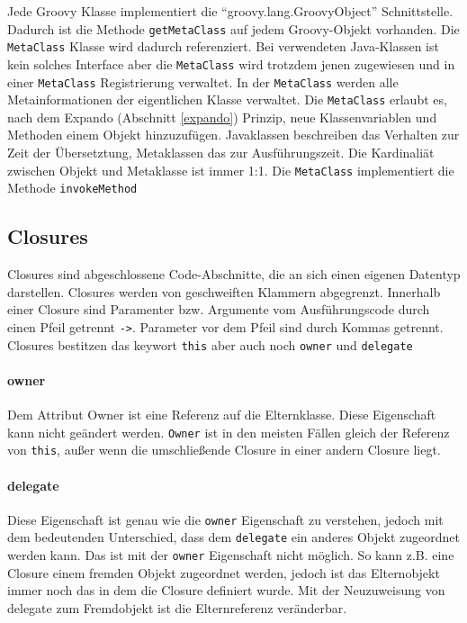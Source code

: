 \documentclass[11pt,english,ngerman, headsepline]{scrreprt}
\begin{document}
Jede Groovy Klasse implementiert die ``groovy.lang.GroovyObject''
 Schnittstelle.
Dadurch ist die Methode \texttt{getMetaClass} auf jedem Groovy-Objekt
vorhanden.
Die \texttt{MetaClass} Klasse wird dadurch referenziert.
Bei verwendeten Java-Klassen ist kein solches Interface aber die
\texttt{MetaClass} wird trotzdem jenen zugewiesen und in einer
\texttt{MetaClass} Registrierung \cite{fowler2003patterns}
verwaltet.
In der \texttt{MetaClass} werden alle Metainformationen der eigentlichen Klasse
verwaltet. Die \texttt{MetaClass} erlaubt es, nach dem Expando (Abschnitt
\ref{expando}) Prinzip, neue Klassenvariablen und Methoden einem Objekt
hinzuzufügen.
Javaklassen beschreiben das Verhalten zur Zeit der Übersetztung, Metaklassen
das zur Ausführungszeit.
Die Kardinaliät zwischen Objekt und Metaklasse ist immer 1:1.
Die \texttt{MetaClass} implementiert die Methode \texttt{invokeMethod}

\subsection{Closures}

Closures sind abgeschlossene Code-Abschnitte, die an sich einen eigenen
Datentyp darstellen. Closures werden von geschweiften Klammern abgegrenzt.
Innerhalb einer Closure sind Paramenter bzw. Argumente vom Ausführungscode durch
einen Pfeil getrennt \texttt{->}. Parameter vor dem Pfeil sind durch Kommas
getrennt.
Closures bestitzen das keywort \texttt{this} aber auch noch \texttt{owner} und
\texttt{delegate}

\paragraph{owner}
Dem Attribut Owner ist eine Referenz auf die Elternklasse. Diese Eigenschaft
kann nicht geändert werden. \texttt{Owner} ist in den meisten Fällen gleich der
Referenz von  \texttt{this}, außer wenn die umschließende Closure in einer
andern Closure liegt.
\paragraph{delegate}
Diese Eigenschaft ist genau wie die \texttt{owner} Eigenschaft zu verstehen,
jedoch mit dem bedeutenden Unterschied, dass dem \texttt{delegate} ein anderes
Objekt zugeordnet werden kann. Das ist mit der \texttt{owner} Eigenschaft nicht
möglich. So kann z.B. eine Closure einem fremden Objekt zugeordnet werden,
jedoch ist das Elternobjekt immer noch das in dem die Closure definiert wurde.
Mit der Neuzuweisung von delegate zum Fremdobjekt ist die Elternreferenz
veränderbar.
\end{document}
